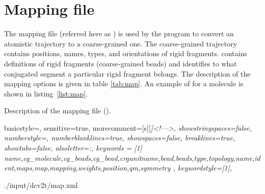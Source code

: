 \section{Mapping file}
\label{sec:xmlmap}
The mapping file (referred here as \xmlcsg) is used by the program \ctpmap to convert an atomistic trajectory to a coarse-grained one. The coarse-grained trajectory contains positions, names, types, and orientations of rigid fragments. \xmlcsg contains definitions of rigid fragments (coarse-grained beads) and identifies to what conjugated segment a particular rigid fragment belongs. The description of the mapping options is given in table \ref{tab:map}. An example of \xmlcsg for a \dcvt molecule is shown in listing~\ref{list:map}. 
%
\begin{table}[h]
\label{tab:map}
\caption{Description of the \xml mapping file (\xmlcsg).}
 {\footnotesize }
\end{table}

 {
   basicstyle=\ttfamily\scriptsize,
   sensitive=true,
   morecomment=[s][\color{gray}\rmfamily\itshape]{<!--}{-->}, 
   showstringspaces=false,
   numberstyle=\scriptsize,
   numberblanklines=true,
   showspaces=false,
   breaklines=true,
   showtabs=false,
   alsoletter={:},
   keywords = [1]
   { name,cg_molecule,cg_beads,cg_bead,crgunitname,bead,beads,type,topology,name,ident,maps,map,mapping,weights,position,qm,symmetry },
   keywordstyle={[1]\color{blue}},
}

%
{./input/dcv2t/map.xml}
